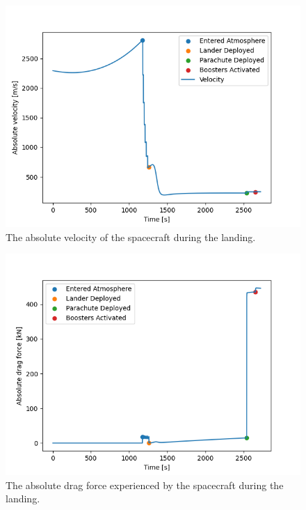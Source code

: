 \documentclass[reprint,english,notitlepage]{revtex4-2}
\begin{document}
\begin{figure}[h]
    \centering
    \includegraphics[scale=0.15]{Figures/landing_velocity}
    \caption{The absolute velocity of the spacecraft during the landing.}\label{fig:landing_velocity}
\end{figure}

\begin{figure}[h]
    \centering
    \includegraphics[scale=0.15]{Figures/landing_f_drag}
    \caption{The absolute drag force experienced by the spacecraft during the landing.}\label{fig:landing_f_drag}
\end{figure}
\end{document}
